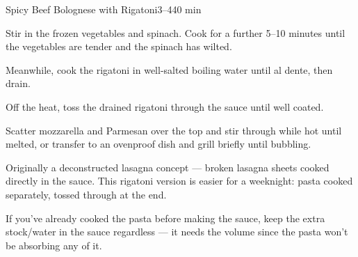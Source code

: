\begin{recipebox}{Spicy Beef Bolognese with Rigatoni}{3--4}{40 min}
\begin{method}
    \item Stir in the frozen vegetables and spinach. Cook for a further 5--10 minutes until the vegetables are tender and the spinach has wilted.
    \item Meanwhile, cook the rigatoni in well-salted boiling water until al dente, then drain.
    \item Off the heat, toss the drained rigatoni through the sauce until well coated.
    \item Scatter mozzarella and Parmesan over the top and stir through while hot until melted, or transfer to an ovenproof dish and grill briefly until bubbling.
  \end{method}
  \begin{notes}
    Originally a deconstructed lasagna concept --- broken lasagna sheets cooked directly in the sauce. This rigatoni version is easier for a weeknight: pasta cooked separately, tossed through at the end.

    If you've already cooked the pasta before making the sauce, keep the extra stock/water in the sauce regardless --- it needs the volume since the pasta won't be absorbing any of it.
  \end{notes}
\end{recipebox}
